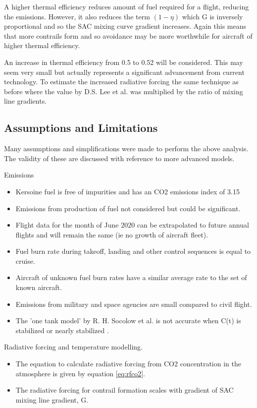 \documentclass{article}
\begin{document}
A higher thermal efficiency reduces amount of fuel required for a flight, reducing the emissions.
However, it also reduces the term $(1-\eta)$ which G is inversely proportional and so the SAC mixing curve gradient increases.
Again this means that more contrails form and so avoidance may be more worthwhile for aircraft of higher thermal efficiency.

An increase in thermal efficiency from 0.5 to 0.52 will be considered.
This may seem very small but actually represents a significant advancement from current technology.
To estimate the increased radiative forcing the same technique as before where the value by D.S. Lee et al. was multiplied by the ratio
of mixing line gradients.


\subsection{Assumptions and Limitations}

Many assumptions and simplifications were made to perform the above analysis.
The validity of these are discussed with reference to more advanced models.

Emissions
\begin{itemize}
    \item Kersoine fuel is free of impurities and has an CO2 emissions index of 3.15
    \item Emissions from production of fuel not considered but could be significant.
    \item Flight data for the month of June 2020 can be extrapolated to future annual flights and will remain the same (ie no growth of aircraft fleet).
    \item Fuel burn rate during takeoff, landing and other control sequences is equal to cruise.
    \item Aircraft of unknown fuel burn rates have a similar average rate to the set of known aircraft.
    \item Emissions from military and space agencies are small compared to civil flight.
    \item The 'one tank model' by R. H. Socolow et al. is not accurate when C(t) is stabilized or nearly stabilized \cite{co2_modelling}.
\end{itemize}

Radiative forcing and temperature modelling.
\begin{itemize}
    \item The equation to calculate radiative forcing from CO2 concentration in the atmosphere is given by equation \ref{eq:rfco2}.
    \item The radiative forcing for contrail formation scales with gradient of SAC mixing line gradient, G.
\end{itemize}
\end{document}
